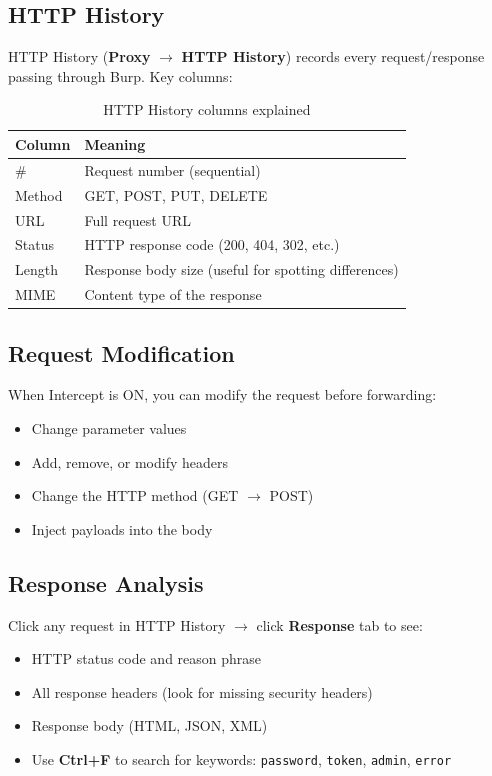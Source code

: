 
\subsection{HTTP History}

HTTP History (\textbf{Proxy} $\to$ \textbf{HTTP History}) records every request/response passing through Burp. Key columns:

\begin{table}[H]
\centering
\caption{HTTP History columns explained}
\begin{tabular}{ll}
\toprule
Column & Meaning \\
\midrule
\# & Request number (sequential) \\
Method & GET, POST, PUT, DELETE \\
URL & Full request URL \\
Status & HTTP response code (200, 404, 302, etc.) \\
Length & Response body size (useful for spotting differences) \\
MIME & Content type of the response \\
\bottomrule
\end{tabular}
\end{table}

\subsection{Request Modification}

When Intercept is ON, you can modify the request before forwarding:
\begin{itemize}
  \item Change parameter values
  \item Add, remove, or modify headers
  \item Change the HTTP method (GET $\to$ POST)
  \item Inject payloads into the body
\end{itemize}

\subsection{Response Analysis}

Click any request in HTTP History $\to$ click \textbf{Response} tab to see:
\begin{itemize}
  \item HTTP status code and reason phrase
  \item All response headers (look for missing security headers)
  \item Response body (HTML, JSON, XML)
  \item Use \textbf{Ctrl+F} to search for keywords: \texttt{password}, \texttt{token}, \texttt{admin}, \texttt{error}
\end{itemize}

